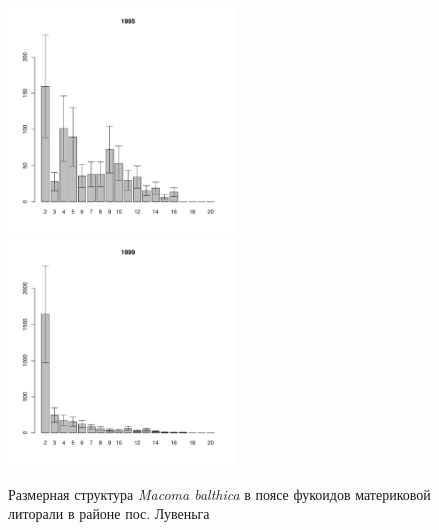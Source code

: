 \documentclass[12pt, a4paper]{article}
\begin{document}
\begin{figure}[h]
\begin{multicols}{3}
\hfill
\includegraphics[width=60mm]{../White_Sea/Luvenga_II_razrez/fucus_zone2_1995_.pdf}
\hfill
\includegraphics[width=60mm]{../White_Sea/Luvenga_II_razrez/fucus_zone2_1999_.pdf}

\end{multicols}


\caption{Размерная структура {\it Macoma balthica} в поясе фукоидов материковой литорали в районе пос. Лувеньга}
\label{ris:size_str_2razrez_fucus}
\end{figure}
\end{document}
